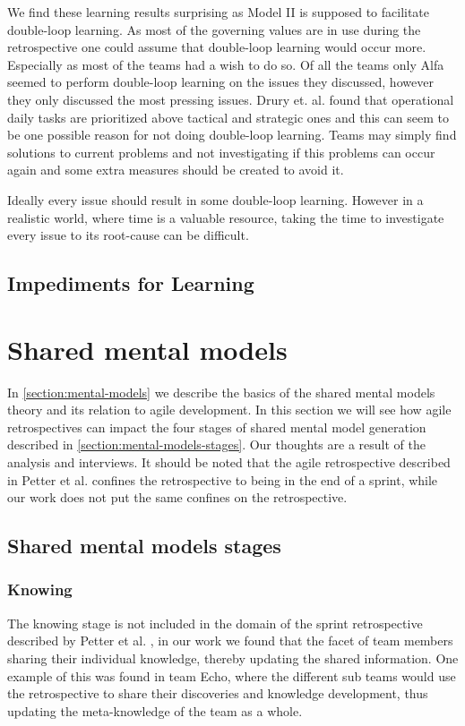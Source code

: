 We find these learning results surprising as Model II is supposed to facilitate double-loop learning. As most of the governing values are in use during the retrospective one could assume that double-loop learning would occur more. Especially as most of the teams had a wish to do so. Of all the teams only Alfa seemed to perform double-loop learning on the issues they discussed, however they only discussed the most pressing issues. Drury et. al. \cite{Drury2012} found that operational daily tasks are prioritized above tactical and strategic ones and this can seem to be one possible reason for not doing double-loop learning. Teams may simply find solutions to current problems and not investigating if this problems can occur again and some extra measures should be created to avoid it. 

Ideally every issue should result in some double-loop learning. However in a realistic world, where time is a valuable resource, taking the time to investigate every issue to its root-cause can be difficult. 

\subsection{Impediments for Learning}
\label{discussion:learning-impediments}

\clearpage
\section{Shared mental models}
In \autoref{section:mental-models} we describe the basics of the shared mental models theory and its relation to agile development. In this section we will see how agile retrospectives can impact the four stages of shared mental model generation described in \autoref{section:mental-models-stages}. Our thoughts are a result of the analysis and interviews. It should be noted that the agile retrospective described in Petter et al. \cite{Petter2013} confines the retrospective to being in the end of a sprint, while our work does not put the same confines on the retrospective.

\subsection{Shared mental models stages}

\subsubsection{Knowing}
The knowing stage is not included in the domain of the sprint retrospective described by Petter et al. \cite{Petter2013}, in our work we found that the facet of team members sharing their individual knowledge, thereby updating the shared information. One example of this was found in team Echo, where the different sub teams would use the retrospective to share their discoveries and knowledge development, thus updating the meta-knowledge of the team as a whole. 

